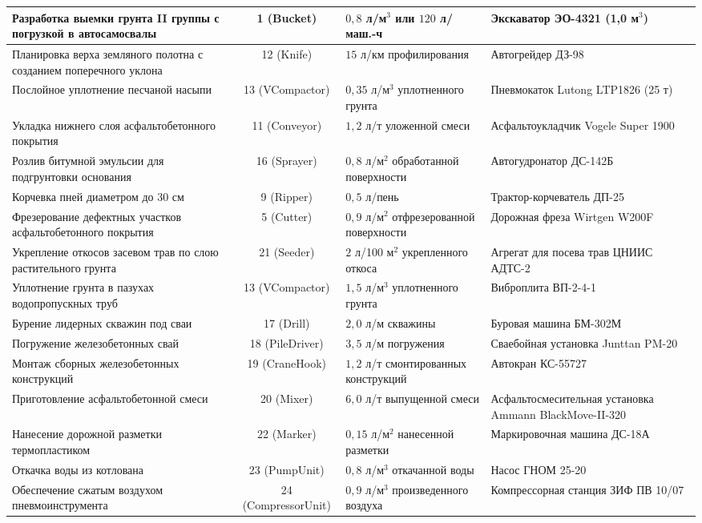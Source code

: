 \begin{longtable}{|>{\raggedright\arraybackslash\hspace{0pt}}p{4.2cm}|c|>{\raggedright\arraybackslash\hspace{0pt}}p{3.2cm}|>{\raggedright\arraybackslash\hspace{0pt}}p{4.5cm}|}
	Разработка выемки грунта II группы с погрузкой в автосамосвалы & 1 (Bucket) & \(0{,}8\) л/м\(^3\) или \(120\) л/маш.-ч & Экскаватор ЭО-4321 (1,0 м\(^3\)) \\
	\hline
	Планировка верха земляного полотна с созданием поперечного уклона & 12 (Knife) & \(15\) л/км профилирования & Автогрейдер ДЗ-98 \\
	\hline
	Послойное уплотнение песчаной насыпи & 13 (VCompactor) & \(0{,}35\) л/м\(^3\) уплотненного грунта & Пневмокаток Lutong LTP1826 (25 т) \\
	\hline
	Укладка нижнего слоя асфальтобетонного покрытия & 11 (Conveyor) & \(1{,}2\) л/т уложенной смеси & Асфальтоукладчик Vogele Super 1900 \\
	\hline
	Розлив битумной эмульсии для подгрунтовки основания & 16 (Sprayer) & \(0{,}8\) л/м\(^2\) обработанной поверхности & Автогудронатор ДС-142Б \\
	\hline
	Корчевка пней диаметром до 30 см & 9 (Ripper) & \(0{,}5\) л/пень & Трактор-корчеватель ДП-25 \\
	\hline
	Фрезерование дефектных участков асфальтобетонного покрытия & 5 (Cutter) & \(0{,}9\) л/м\(^2\) отфрезерованной поверхности & Дорожная фреза Wirtgen W200F \\
	\hline
	Укрепление откосов засевом трав по слою растительного грунта & 21 (Seeder) & \(2\) л/100 м\(^2\) укрепленного откоса & Агрегат для посева трав ЦНИИС АДТС-2 \\
	\hline
	Уплотнение грунта в пазухах водопропускных труб & 13 (VCompactor) & \(1{,}5\) л/м\(^3\) уплотненного грунта & Виброплита ВП-2-4-1 \\
	\hline
	Бурение лидерных скважин под сваи & 17 (Drill) & \(2{,}0\) л/м скважины & Буровая машина БМ-302М \\
	\hline
	Погружение железобетонных свай & 18 (PileDriver) & \(3{,}5\) л/м погружения & Сваебойная установка Junttan PM-20 \\
	\hline
	Монтаж сборных железобетонных конструкций & 19 (CraneHook) & \(1{,}2\) л/т смонтированных конструкций & Автокран КС-55727 \\
	\hline
	Приготовление асфальтобетонной смеси & 20 (Mixer) & \(6{,}0\) л/т выпущенной смеси & Асфальтосмесительная установка Ammann BlackMove-II-320 \\
	\hline
	Нанесение дорожной разметки термопластиком & 22 (Marker) & \(0{,}15\) л/м\(^2\) нанесенной разметки & Маркировочная машина ДС-18А \\
	\hline
	Откачка воды из котлована & 23 (PumpUnit) & \(0{,}8\) л/м\(^3\) откачанной воды & Насос ГНОМ 25-20 \\
	\hline
	Обеспечение сжатым воздухом пневмоинструмента & 24 (CompressorUnit) & \(0{,}9\) л/м\(^3\) произведенного воздуха & Компрессорная станция ЗИФ ПВ 10/07 \\
	\hline
\end{longtable}

